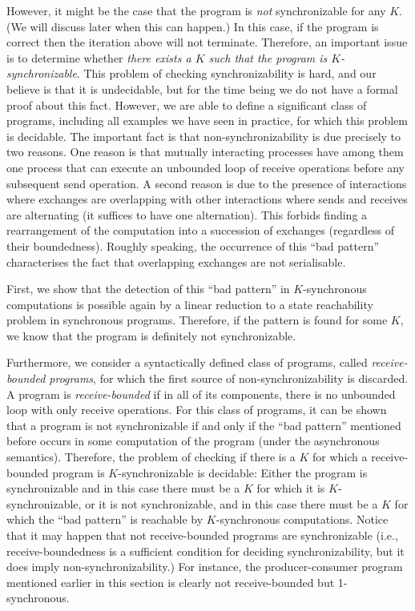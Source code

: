 However, it might be the case that the program is {\em not} synchronizable for any $K$. (We will discuss later when this can happen.) In this case, if the program is correct then the iteration above will not terminate. Therefore, an important issue is to determine whether {\em there exists a $K$ such that the program is $K$-synchronizable}. This problem of checking synchronizability is hard, and our believe is that it is undecidable, but for the time being we do not have a formal proof about this fact. However, we are able to define a significant class of programs, including all examples we have seen in practice, for which this problem is decidable.  The important fact is that non-synchronizability is due precisely to two reasons. One reason is that mutually interacting processes have among them one process that can execute an unbounded loop of receive operations before any subsequent send operation. 
A second reason is due to the presence of interactions where exchanges are overlapping with other interactions where sends and receives are alternating (it suffices to have one alternation). This forbids finding a rearrangement of the computation into a succession of exchanges (regardless of their boundedness). Roughly speaking, the occurrence of this “bad pattern” characterises the fact that overlapping exchanges are not serialisable. 

First, we show that the detection of this “bad pattern” in $K$-synchronous computations is possible again by a linear reduction to a state reachability problem in synchronous programs. Therefore, if the pattern is found for some $K$, we know that the program is definitely not synchronizable. 

Furthermore, we consider a syntactically defined class of programs, called {\em receive-bounded programs}, for which the first source of non-synchronizability is  discarded. A program is {\em receive-bounded} if in all of its components, there is no unbounded loop with only receive operations. For this class of programs, it can be shown that a program is not synchronizable if and only if the “bad pattern” mentioned before occurs in some computation of the program (under the asynchronous semantics). Therefore, the problem of checking if there is a $K$ for which a receive-bounded program is $K$-synchronizable is decidable: Either the program is synchronizable and in this case there must be a $K$ for which it is $K$-synchronizable, or it is not synchronizable, and in this case there must be a $K$ for which the “bad pattern” is reachable by $K$-synchronous computations. Notice that it may happen that not receive-bounded programs are synchronizable (i.e., receive-boundedness is a sufficient condition for deciding synchronizability, but it does imply non-synchronizability.) For instance, the producer-consumer program mentioned earlier in this section is clearly not receive-bounded but 1-synchronous. 

